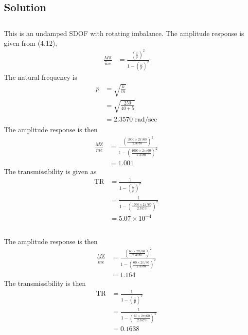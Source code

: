 \subsection*{Solution}
\subsection{}
This is an undamped SDOF with rotating imbalance. The amplitude response is given from (4.12), 
\begin{align*}
    \frac{M \mathbb{X}}{\tilde{m} e} &= \frac{\left(\frac{\omega}{p}\right)^2}{1 - \left(\frac{\omega}{p}\right)^2} 
\end{align*}
The natural frequency is
\begin{align*}
    p &= \sqrt{\frac{k}{m}} \\
    &= \sqrt{\frac{250}{40 + 5}} \\
    &= 2.3570 \text{ rad/sec}
\end{align*}
The amplitude response is then
\begin{align*}
    \frac{M \mathbb{X}}{\tilde{m} e} &= \frac{\left(\frac{1000 \times 2\pi/60}{2.3570}\right)^2}{1 - \left(\frac{1000 \times 2\pi/60}{2.3570}\right)^2} \\
    &= \boxed{1.001} 
\end{align*}
The transmissibility is given as
\begin{align*}
    \text{TR} &= \frac{1}{1 - \left(\frac{\omega}{p}\right)^2} \\
    &= \frac{1}{1 - \left(\frac{1000 \times 2\pi/60}{2.3570}\right)^2} \\
    &= \boxed{5.07 \times 10^{-4}}
\end{align*}

\subsection{}
The amplitude response is then
\begin{align*}
    \frac{M \mathbb{X}}{\tilde{m} e} &= \frac{\left(\frac{60 \times 2\pi/60}{2.3570}\right)^2}{1 - \left(\frac{60 \times 2\pi/60}{2.3570}\right)^2} \\
    &= \boxed{1.164}
\end{align*}
The transmissibility is then
\begin{align*}
    \text{TR} &= \frac{1}{1 - \left(\frac{\omega}{p}\right)^2} \\
    &= \frac{1}{1 - \left(\frac{60 \times 2\pi/60}{2.3570}\right)^2} \\
    &= \boxed{0.1638}
\end{align*}